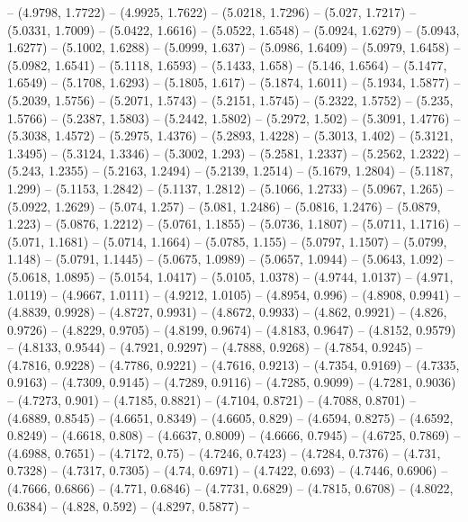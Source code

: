 {  -- (4.9798, 1.7722) -- (4.9925, 1.7622) -- (5.0218, 1.7296) -- (5.027, 1.7217)
   -- (5.0331, 1.7009) -- (5.0422, 1.6616) -- (5.0522, 1.6548) -- (5.0924, 
  1.6279) -- (5.0943, 1.6277) -- (5.1002, 1.6288) -- (5.0999, 1.637) -- (5.0986,
   1.6409) -- (5.0979, 1.6458) -- (5.0982, 1.6541) -- (5.1118, 1.6593) -- 
  (5.1433, 1.658) -- (5.146, 1.6564) -- (5.1477, 1.6549) -- (5.1708, 1.6293) -- 
  (5.1805, 1.617) -- (5.1874, 1.6011) -- (5.1934, 1.5877) -- (5.2039, 1.5756) --
   (5.2071, 1.5743) -- (5.2151, 1.5745) -- (5.2322, 1.5752) -- (5.235, 1.5766) 
  -- (5.2387, 1.5803) -- (5.2442, 1.5802) -- (5.2972, 1.502) -- (5.3091, 1.4776)
   -- (5.3038, 1.4572) -- (5.2975, 1.4376) -- (5.2893, 1.4228) -- (5.3013, 
  1.402) -- (5.3121, 1.3495) -- (5.3124, 1.3346) -- (5.3002, 1.293) -- (5.2581, 
  1.2337) -- (5.2562, 1.2322) -- (5.243, 1.2355) -- (5.2163, 1.2494) -- (5.2139,
   1.2514) -- (5.1679, 1.2804) -- (5.1187, 1.299) -- (5.1153, 1.2842) -- 
  (5.1137, 1.2812) -- (5.1066, 1.2733) -- (5.0967, 1.265) -- (5.0922, 1.2629) --
   (5.074, 1.257) -- (5.081, 1.2486) -- (5.0816, 1.2476) -- (5.0879, 1.223) -- 
  (5.0876, 1.2212) -- (5.0761, 1.1855) -- (5.0736, 1.1807) -- (5.0711, 1.1716) 
  -- (5.071, 1.1681) -- (5.0714, 1.1664) -- (5.0785, 1.155) -- (5.0797, 1.1507) 
  -- (5.0799, 1.148) -- (5.0791, 1.1445) -- (5.0675, 1.0989) -- (5.0657, 1.0944)
   -- (5.0643, 1.092) -- (5.0618, 1.0895) -- (5.0154, 1.0417) -- (5.0105, 
  1.0378) -- (4.9744, 1.0137) -- (4.971, 1.0119) -- (4.9667, 1.0111) -- (4.9212,
   1.0105) -- (4.8954, 0.996) -- (4.8908, 0.9941) -- (4.8839, 0.9928) -- 
  (4.8727, 0.9931) -- (4.8672, 0.9933) -- (4.862, 0.9921) -- (4.826, 0.9726) -- 
  (4.8229, 0.9705) -- (4.8199, 0.9674) -- (4.8183, 0.9647) -- (4.8152, 0.9579) 
  -- (4.8133, 0.9544) -- (4.7921, 0.9297) -- (4.7888, 0.9268) -- (4.7854, 
  0.9245) -- (4.7816, 0.9228) -- (4.7786, 0.9221) -- (4.7616, 0.9213) -- 
  (4.7354, 0.9169) -- (4.7335, 0.9163) -- (4.7309, 0.9145) -- (4.7289, 0.9116) 
  -- (4.7285, 0.9099) -- (4.7281, 0.9036) -- (4.7273, 0.901) -- (4.7185, 0.8821)
   -- (4.7104, 0.8721) -- (4.7088, 0.8701) -- (4.6889, 0.8545) -- (4.6651, 
  0.8349) -- (4.6605, 0.829) -- (4.6594, 0.8275) -- (4.6592, 0.8249) -- (4.6618,
   0.808) -- (4.6637, 0.8009) -- (4.6666, 0.7945) -- (4.6725, 0.7869) -- 
  (4.6988, 0.7651) -- (4.7172, 0.75) -- (4.7246, 0.7423) -- (4.7284, 0.7376) -- 
  (4.731, 0.7328) -- (4.7317, 0.7305) -- (4.74, 0.6971) -- (4.7422, 0.693) -- 
  (4.7446, 0.6906) -- (4.7666, 0.6866) -- (4.771, 0.6846) -- (4.7731, 0.6829) --
   (4.7815, 0.6708) -- (4.8022, 0.6384) -- (4.828, 0.592) -- (4.8297, 0.5877) --
}
